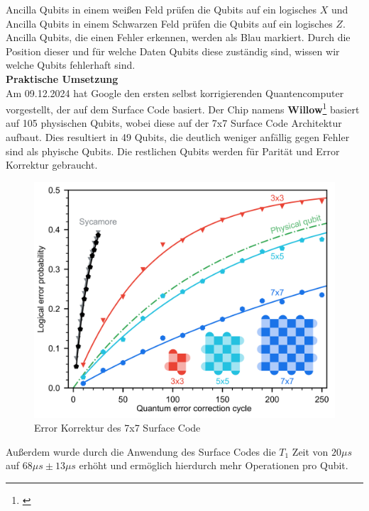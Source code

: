 Ancilla Qubits in einem weißen Feld prüfen die Qubits auf ein logisches $X$ und Ancilla Qubits in einem Schwarzen Feld prüfen die Qubits auf ein logisches $Z$.\\

Ancilla Qubits, die einen Fehler erkennen, werden als Blau markiert. Durch die Position dieser und für welche Daten Qubits diese zuständig sind, wissen wir welche Qubits fehlerhaft sind.\\

\textbf{Praktische Umsetzung}\\
Am 09.12.2024 hat Google den ersten selbst korrigierenden Quantencomputer vorgestellt, der auf dem Surface Code basiert.
Der Chip namens \textbf{Willow}\footnote{\cite{acharya_quantum_2024}} basiert auf 105 physischen Qubits, wobei diese auf der 7x7 Surface Code Architektur aufbaut.
Dies resultiert in 49 Qubits, die deutlich weniger anfällig gegen Fehler sind als phyische Qubits. Die restlichen Qubits werden für Parität und Error Korrektur gebraucht.\\

\begin{figure}[H]
    \centering
    \includegraphics[width=0.7\linewidth]{img/Surface-Code-Scaling.png}
    \caption{Error Korrektur des 7x7 Surface Code \cite{acharya_quantum_2024}}
    \label{fig:Willow}
\end{figure}

Außerdem wurde durch die Anwendung des Surface Codes die $T_1$ Zeit von $20\mu s$ auf $68\mu s\pm13\mu s$ erhöht und ermöglich hierdurch mehr Operationen pro Qubit.\\